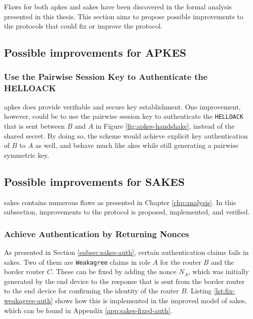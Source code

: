 Flaws for both \gls{apkes} and \gls{sakes} have been discovered in the formal analysis presented in this thesis. This section aims to propose possible improvements to the protocols that could fix or improve the protocol.

\subsection{Possible improvements for APKES}

\subsubsection{Use the Pairwise Session Key to Authenticate the HELLOACK}

\gls{apkes} does provide verifiable and secure key establishment. One improvement, however, could be to use the pairwise session key to authenticate the \texttt{HELLOACK} that is sent between $B$ and $A$ in Figure \ref{fig:apkes-handshake}, instead of the shared secret. By doing so, the scheme would achieve explicit key authentication of $B$ to $A$ as well, and behave much like \gls{akes} while still generating a pairwise symmetric key.



\subsection{Possible improvements for SAKES}
\label{subsec:sakes-fix}
\gls{sakes} contains numerous flaws as presented in Chapter \ref{chp:analysis}. In this subsection, improvements to the protocol is proposed, implemented, and verified.

\subsubsection{Achieve Authentication by Returning Nonces}


As presented in Section \ref{subsec:sakes-auth}, certain authentication claims fails in \gls{sakes}. Two of them are \texttt{Weakagree} claims in role $A$ for the router $B$ and the border router $C$. These can be fixed by adding the nonce $N_A$, which was initially generated by the end device to the response that is sent from the border router to the end device for confirming the identity of the router $B$. Listing \ref{lst:fix-weakagree-auth} shows how this is implemented in the improved model of \gls{sakes}, which can be found in Appendix \ref{app:sakes-fixed-auth}.\\

